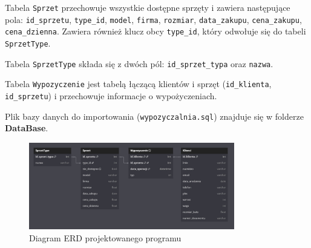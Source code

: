 Tabela \texttt{Sprzet} przechowuje wszystkie dostępne sprzęty i zawiera następujące pola: \texttt{id\_sprzetu}, \texttt{type\_id}, \texttt{model}, \texttt{firma}, \texttt{rozmiar}, \texttt{data\_zakupu}, \texttt{cena\_zakupu}, \texttt{cena\_dzienna}. 
Zawiera również klucz obcy \texttt{type\_id}, który odwołuje się do tabeli \texttt{SprzetType}.

Tabela \texttt{SprzetType} składa się z dwóch pól: \texttt{id\_sprzet\_typa} oraz \texttt{nazwa}.

Tabela \texttt{Wypozyczenie} jest tabelą łączącą klientów i sprzęt (\texttt{id\_klienta}, \texttt{id\_sprzetu}) i przechowuje informacje o wypożyczeniach.

Plik bazy danych do importowania (\texttt{wypozyczalnia.sql}) znajduje się w folderze \textbf{DataBase}.

\begin{figure}[h]
    \centering
    \includegraphics[width=0.8\textwidth]{figures/struktura_db.jpg}
    \caption{Diagram ERD projektowanego programu}
\end{figure} 


